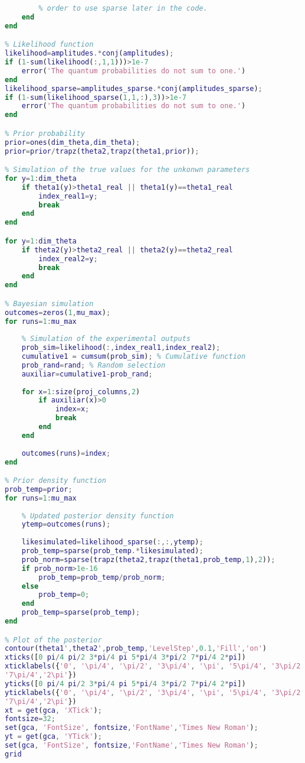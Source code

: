 \begin{lstlisting}[language=Matlab, mathescape=true]
        % The second method of generating the amplitudes is included in 
        % order to use sparse later in the code.
    end
end

% Likelihood function
likelihood=amplitudes.*conj(amplitudes);
if (1-sum(likelihood(:,1,1)))>1e-7
    error('The quantum probabilities do not sum to one.')
end
likelihood_sparse=amplitudes_sparse.*conj(amplitudes_sparse);
if (1-sum(likelihood_sparse(1,1,:),3))>1e-7
    error('The quantum probabilities do not sum to one.')
end

% Prior probability
prior=ones(dim_theta,dim_theta);
prior=prior/trapz(theta2,trapz(theta1,prior));

% Simulation of the true values for the unkonwn parameters
for y=1:dim_theta 
    if theta1(y)>theta1_real || theta1(y)==theta1_real
        index_real1=y;
        break
    end
end

for y=1:dim_theta
    if theta2(y)>theta2_real || theta2(y)==theta2_real
        index_real2=y;
        break
    end
end

% Bayesian simulation
outcomes=zeros(1,mu_max);
for runs=1:mu_max
    
    % Simulation of the experimental outputs
    prob_sim=likelihood(:,index_real1,index_real2);
    cumulative1 = cumsum(prob_sim); % Cumulative function
    prob_rand=rand; % Random selection
    auxiliar=cumulative1-prob_rand;
    
    for x=1:size(proj_columns,2)
        if auxiliar(x)>0
            index=x;
            break
        end
    end
   
    outcomes(runs)=index;
end

% Prior density function
prob_temp=prior;
for runs=1:mu_max
    
    % Updated posterior density function
    ytemp=outcomes(runs);
    
    likesimulated=likelihood_sparse(:,:,ytemp);
    prob_temp=sparse(prob_temp.*likesimulated);
    prob_norm=sparse(trapz(theta2,trapz(theta1,prob_temp,1),2));
    if prob_norm>1e-16
        prob_temp=prob_temp/prob_norm;
    else
        prob_temp=0;
    end
    prob_temp=sparse(prob_temp);
end

% Plot of the posterior
contour(theta1',theta2',prob_temp,'LevelStep',0.1,'Fill','on')
xticks([0 pi/4 pi/2 3*pi/4 pi 5*pi/4 3*pi/2 7*pi/4 2*pi])
xticklabels({'0', '\pi/4', '\pi/2', '3\pi/4', '\pi', '5\pi/4', '3\pi/2',$\hspace{0.15em}\swarrow$
'7\pi/4','2\pi'})
yticks([0 pi/4 pi/2 3*pi/4 pi 5*pi/4 3*pi/2 7*pi/4 2*pi])
yticklabels({'0', '\pi/4', '\pi/2', '3\pi/4', '\pi', '5\pi/4', '3\pi/2',$\hspace{0.15em}\swarrow$
'7\pi/4','2\pi'})
xt = get(gca, 'XTick');
fontsize=32;
set(gca, 'FontSize', fontsize,'FontName','Times New Roman');
yt = get(gca, 'YTick');
set(gca, 'FontSize', fontsize,'FontName','Times New Roman');
grid
\end{lstlisting}

